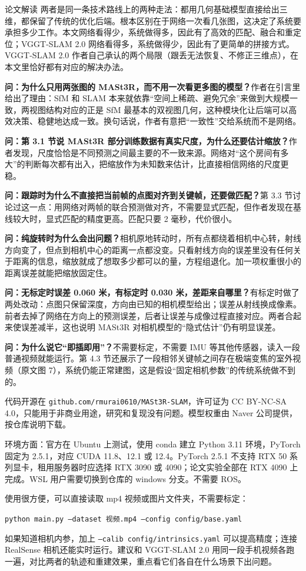 \begin{interp}{论文解读}
两者是同一条技术路线上的两种走法：都用几何基础模型直接给出三维，都保留了传统的优化后端。根本区别在于网络一次看几张图，这决定了系统要承担多少工作。本文网络看得少，系统做得多，因此有了高效的匹配、融合和重定位；VGGT-SLAM 2.0 网络看得多，系统做得少，因此有了更简单的拼接方式。VGGT-SLAM 2.0 作者自己承认的两个局限（跟丢无法恢复、不修正三维点），在本文里恰好都有对应的解决办法。


\textbf{问：为什么只用两张图的 MASt3R，而不用一次看更多图的模型？}\quad 作者在引言里给出了理由：SfM 和 SLAM 本来就依靠“空间上稀疏、避免冗余”来做到大规模一致，两视图结构对应的正是 SfM 最基本的双视图几何，这种模块化让后端可以高效决策、稳健地达成一致。换句话说，作者有意把“一致性”交给系统而不是网络。

\textbf{问：第 3.1 节说 MASt3R 部分训练数据有真实尺度，为什么还要估计缩放？}\quad 作者发现，尺度恰恰是不同预测之间最主要的不一致来源。网络对“这个房间有多大”的判断每次都有出入，把缩放作为未知数来估计，比直接相信网络的尺度更稳。

\textbf{问：跟踪时为什么不直接把当前帧的点图对齐到关键帧，还要做匹配？}\quad 第 3.3 节讨论过这一点：用网络对两帧的联合预测做对齐，不需要显式匹配，但作者发现在基线较大时，显式匹配的精度更高。匹配只要 2 毫秒，代价很小。

\textbf{问：纯旋转时为什么会出问题？}\quad 相机原地转动时，所有点都绕着相机中心转，射线方向变了，但点到相机中心的距离一点都没变。只看射线方向的误差里没有任何关于距离的信息，缩放就成了想取多少都可以的量，方程组退化。加一项权重很小的距离误差就能把缩放固定住。

\textbf{问：无标定时误差 0.060 米，有标定时 0.030 米，差距来自哪里？}\quad 有标定时做了两处改动：点图只保留深度，方向由已知的相机模型给出；误差从射线换成像素。前者去掉了网络在方向上的预测误差，后者让误差与成像过程直接对应。两者合起来使误差减半，这也说明 MASt3R 对相机模型的“隐式估计”仍有明显误差。

\textbf{问：为什么说它“即插即用”？}\quad 不需要标定，不需要 IMU 等其他传感器，读入一段普通视频就能运行。第 4.3 节还展示了一段相邻关键帧之间存在极端变焦的室外视频（原文图 7），系统仍能正常建图，这是假设“固定相机参数”的传统系统做不到的。


代码开源在 \texttt{github.com/rmurai0610/MASt3R-SLAM}，许可证为 CC BY-NC-SA 4.0，只能用于非商业用途，研究和复现没有问题。模型权重由 Naver 公司提供，按仓库说明下载。

环境方面：官方在 Ubuntu 上测试，使用 conda 建立 Python 3.11 环境，PyTorch 固定为 2.5.1，对应 CUDA 11.8、12.1 或 12.4。PyTorch 2.5.1 不支持 RTX 50 系列显卡，租用服务器时应选择 RTX 3090 或 4090；论文实验全部在 RTX 4090 上完成。WSL 用户需要切换到仓库的 windows 分支。不需要 ROS。

使用很方便，可以直接读取 mp4 视频或图片文件夹，不需要标定：

\begin{center}
\texttt{python main.py --dataset 视频.mp4 --config config/base.yaml}
\end{center}

如果知道相机内参，加上 \texttt{--calib config/intrinsics.yaml} 可以提高精度；连接 RealSense 相机还能实时运行。建议和 VGGT-SLAM 2.0 用同一段手机视频各跑一遍，对比两者的轨迹和重建效果，重点看它们各自在什么场景下出问题。

\end{interp}
